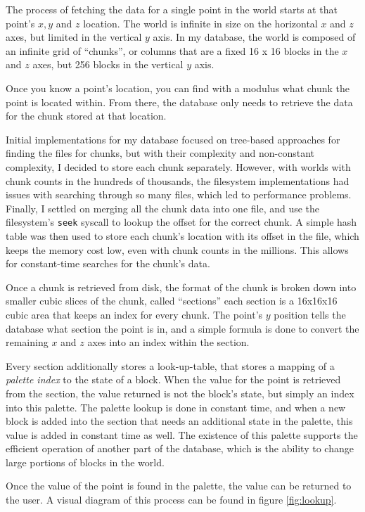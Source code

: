 \documentclass[10pt,twocolumn]{article}
\begin{document}
The process of fetching the data for a single point in the world starts at that
point's $x, y$ and $z$ location. The world is infinite in size on the horizontal
$x$ and $z$ axes, but limited in the vertical $y$ axis. In my database, the
world is composed of an infinite grid of ``chunks'', or columns that are a fixed
16 x 16 blocks in the $x$ and $z$ axes, but 256 blocks in the vertical $y$ axis.

Once you know a point's location, you can find with a modulus what chunk the
point is located within. From there, the database only needs to retrieve the
data for the chunk stored at that location.

Initial implementations for my database focused on tree-based approaches for
finding the files for chunks, but with their complexity and non-constant
complexity, I decided to store each chunk separately. However, with worlds with
chunk counts in the hundreds of thousands, the filesystem implementations had
issues with searching through so many files, which led to performance problems.
Finally, I settled on merging all the chunk data into one file, and use the
filesystem's \verb|seek| syscall to lookup the offset for the correct chunk. A
simple hash table was then used to store each chunk's location with its offset
in the file, which keeps the memory cost low, even with chunk counts in the
millions. This allows for constant-time searches for the chunk's data.

Once a chunk is retrieved from disk, the format of the chunk is broken down into
smaller cubic slices of the chunk, called ``sections'' each section is a
16x16x16 cubic area that keeps an index for every chunk. The point's $y$
position tells the database what section the point is in, and a simple formula
is done to convert the remaining $x$ and $z$ axes into an index within the
section.

Every section additionally stores a look-up-table, that stores a mapping of a
\textit{palette index} to the state of a block. When the value for the point is
retrieved from the section, the value returned is not the block's state, but
simply an index into this palette. The palette lookup is done in constant time,
and when a new block is added into the section that needs an additional state in
the palette, this value is added in constant time as well. The existence of this
palette supports the efficient operation of another part of the database, which
is the ability to change large portions of blocks in the world.

Once the value of the point is found in the palette, the value can be returned
to the user. A visual diagram of this process can be found in figure
\ref{fig:lookup}.
\end{document}
